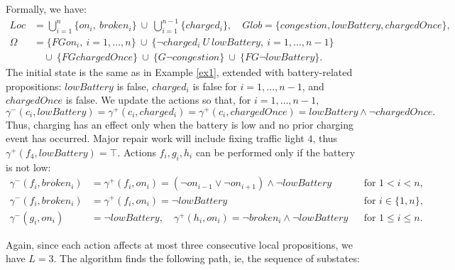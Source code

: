 \documentclass[]{jair}
\begin{document}
\noindent Formally, we have:
\begin{equation}
\begin{aligned}
Loc &= \bigcup_{i=1}^{n} \{on_i,\ broken_i\}\ \cup\ \bigcup_{i=1}^{n-1}\{charged_i\},\quad Glob = \{congestion, lowBattery, chargedOnce\}, \\
\Omega &= \{FG on_i,\ i = 1,\dots, n\}\ \cup\ \{\neg charged_i\ U\ lowBattery,\ i = 1,\dots, n-1\} \\
&\quad \cup\ \{FG chargedOnce\}\ \cup\ \{G\neg congestion\}\ \cup\ \{FG\neg lowBattery\}.
\end{aligned}
\end{equation}
The initial state is the same as in Example \ref{ex1}, extended with battery-related propositions: $lowBattery$ is false, $charged_i$ is false for $i=1,\dots,n-1$, and $chargedOnce$ is false.
We update the actions so that, for $i=1,\dots,n-1$,
\begin{equation}
\gamma^{-}(c_i,lowBattery)=\gamma^{+}(c_i, charged_i)=\gamma^{+}(c_i, chargedOnce)=lowBattery\wedge \neg chargedOnce.
\end{equation}
Thus, charging has an effect only when the battery is low and no prior charging event has occurred. Major repair work will include fixing traffic light $4$, thus $\gamma^{+}(f_4,lowBattery)  = \top$. Actions $f_i, g_i, h_i$ can be performed only if the battery is not low:
\begin{equation}
\begin{aligned}
\gamma^-(f_i, broken_i)&=\gamma^+(f_i, on_i)=(\neg on_{i-1}\lor \neg on_{i+1})\wedge \neg lowBattery &&\text{for } 1<i<n,\\
\gamma^-(f_i, broken_i)&=\gamma^+(f_i, on_i)=\neg lowBattery &&\text{for } i\in\{1,n\},\\
\gamma^-(g_i, on_i)&=\neg lowBattery,\quad \gamma^+(h_i, on_i)= \neg broken_i \wedge \neg lowBattery &&\text{for } 1\le i\le n.
\end{aligned}
\end{equation}

Again, since each action affects at most three consecutive local propositions, we have $L = 3$. The algorithm finds the following path, ie, the sequence of substates: 
\end{document}
